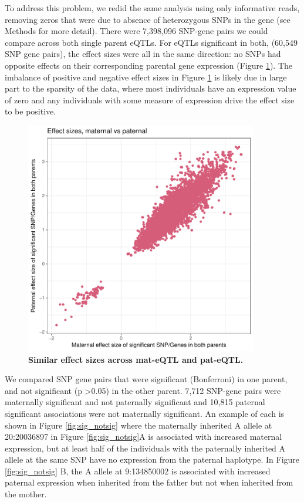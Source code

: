 To address this problem, we redid the same analysis using only informative reads, removing zeros that were due to absence of heterozygous SNPs in the gene (see Methods for more detail). There were 7,398,096 SNP-gene pairs we could compare across both single parent eQTLs. For eQTLs significant in both, (60,549 SNP gene pairs), the effect sizes were all in the same direction: no SNPs had opposite effects on their corresponding parental gene expression (Figure \ref{fig:effectsizes}). The imbalance of positive and negative effect sizes in Figure \ref{fig:effectsizes} is likely due in large part to the sparsity of the data, where most individuals have an expression value of zero and any individuals with some measure of expression drive the effect size to be positive.

\begin{figure}[!htb]
\centering \includegraphics[width=4in]{img/ch04/fig-06-effectsizes.pdf}
\caption[Similar effect sizes across mat-eQTL and pat-eQTL.]{\textbf{Similar effect sizes across mat-eQTL and pat-eQTL.} }
\label{fig:effectsizes}
\end{figure}


We compared SNP gene pairs that were significant (Bonferroni) in one parent, and not significant (p \textgreater 0.05) in the other parent. 7,712 SNP-gene pairs were maternally significant and not paternally significant and 10,815 paternal significant associations were not maternally significant. An example of each is shown in Figure \ref{fig:sig_notsig} where the maternally inherited A allele at 20:20036897 in Figure \ref{fig:sig_notsig}A is associated with increased maternal expression, but at least half of the individuals with the paternally inherited A allele at the same SNP have no expression from the paternal haplotype. In Figure \ref{fig:sig_notsig} B, the A allele at 9:134850002 is associated with increased paternal expression when inherited from the father but not when inherited from the mother.


